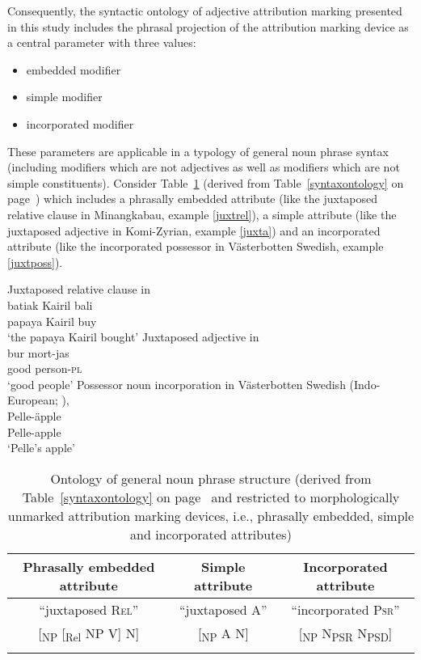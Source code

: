 Consequently, the syntactic ontology of adjective attribution marking presented in this study includes the phrasal projection of the attribution marking device as a central parameter with three values:
\begin{itemize}
\item embedded modifier
\item simple modifier
\item incorporated modifier
\end{itemize}
These parameters are applicable in a typology of general noun phrase syntax (including modifiers which are not adjectives as well as modifiers which are not simple constituents). Consider Table~\ref{ontologyderived} (derived from Table~\ref{syntaxontology} on page~\pageref{syntaxontology}) which includes a phrasally embedded attribute (like the juxtaposed relative clause in Minangkabau, example \ref{juxtrel}), a simple attribute (like the juxtaposed adjective in Komi-Zyrian, example \ref{juxta}) and an incorporated attribute (like the incorporated possessor in Västerbotten Swedish, example \ref{juxtposs}).
\begin{exe}
\ex
\begin{xlist}
\ex
\label{juxtrel}
{\rm Juxtaposed relative clause in }\\
\gll batiak Kairil bali\\
	papaya Kairil buy\\
\glt	‘the papaya Kairil bought’
\ex
\label{juxta}
{\rm Juxtaposed adjective in }\\
\gll		bur	mort-jas\\
		good	person-\textsc{pl}\\
\glt		‘good people’
\ex
\label{juxtposs}
{\rm Possessor noun incorporation in Västerbotten Swedish (Indo-European; \citealt[examples from][3–4]{gil2005})}‚\\
\gll	Pelle-äpple\\
	Pelle-apple\\
\glt	‘Pelle's apple’
\end{xlist}
\end{exe}
\begin{table}
\begin{tabular}{c c c}
\lsptoprule
Phrasally embedded	attribute		&Simple	attribute				&Incorporated attribute\\
\midrule
“juxtaposed \textsc{Rel}”		&“juxtaposed \textsc{A}”		&“incorporated \textsc{Psr}”\\
\midrule
{[}\textsubscript{NP} [\textsubscript{Rel} NP V] N]	&[\textsubscript{NP} A N]			&[\textsubscript{NP} N\textsubscript{PSR} N\textsubscript{PSD}]\\
\lspbottomrule
\end{tabular}
\caption[Ontology of general noun phrase structure]{Ontology of general noun phrase structure (derived from Table~\ref{syntaxontology} on page~\pageref{syntaxontology} and restricted to morphologically unmarked attribution marking devices, i.e., phrasally embedded, simple and incorporated attributes)}\label{ontologyderived}
\end{table}
